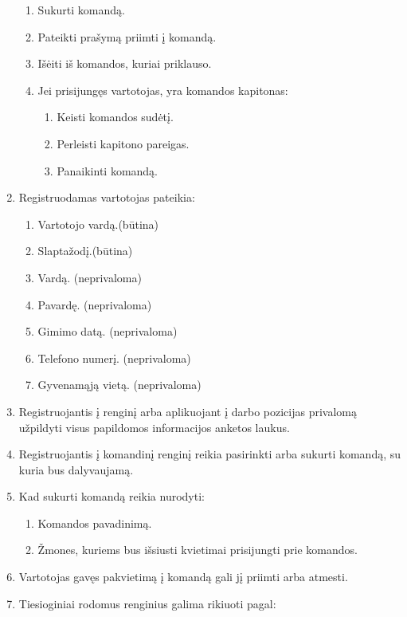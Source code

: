 \documentclass{VUMIFPSkursinis}
\begin{document}
\begin{enumerate}[label=\textbf{FR\arabic*}]
\begin{enumerate}[label*=\textbf{.\arabic*}]
						\item Sukurti komandą.
						\item Pateikti prašymą priimti į komandą.
						\item Išėiti iš komandos, kuriai priklauso.
						\item Jei prisijungęs vartotojas, yra komandos kapitonas:
						\begin{enumerate}[label*=\textbf{.\arabic*}]
							\item Keisti komandos sudėtį.
							\item Perleisti kapitono pareigas.
							\item Panaikinti komandą.
						\end{enumerate}
					\end{enumerate}				
				\item Registruodamas vartotojas pateikia:
					\begin{enumerate}[label*=\textbf{.\arabic*}]
						\item Vartotojo vardą.(būtina)
						\item Slaptažodį.(būtina)
						\item Vardą. (neprivaloma)
						\item Pavardę. (neprivaloma)
						\item Gimimo datą. (neprivaloma)
						\item Telefono numerį. (neprivaloma)
						\item Gyvenamąją vietą. (neprivaloma)
					\end{enumerate}
				\item Registruojantis į renginį arba aplikuojant į darbo pozicijas privalomą užpildyti visus papildomos informacijos anketos laukus.
				\item Registruojantis į komandinį renginį reikia pasirinkti arba sukurti komandą, su kuria bus dalyvaujamą.
				\item Kad sukurti komandą reikia nurodyti:
					\begin{enumerate}[label*=\textbf{.\arabic*}]
						\item Komandos pavadinimą.
						\item Žmones, kuriems bus išsiusti kvietimai prisijungti prie komandos.
					\end{enumerate}
				\item Vartotojas gavęs pakvietimą į komandą gali jį priimti arba atmesti.
				\item Tiesioginiai rodomus renginius galima rikiuoti pagal:
					\begin{enumerate}[label*=\textbf{.\arabic*}]

\end{enumerate}
\end{enumerate}
\end{document}
